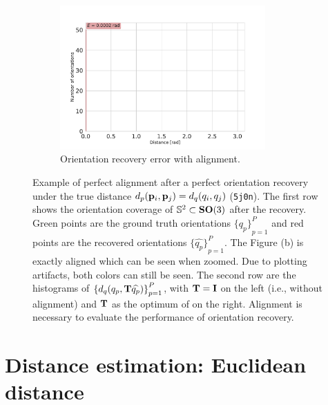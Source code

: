 \begin{figure}[ht!]
\begin{subfigure}[b]{0.45\textwidth}
    \end{subfigure}
    \hfill
    \begin{subfigure}[b]{0.5\textwidth}
    \centering
        \includegraphics[height=5.5cm]{figures/5j0n_perfect_angle_ralignment_after}
        \caption{Orientation recovery error with alignment.}
    \end{subfigure}
    \caption{%
        Example of perfect alignment after a perfect orientation recovery under the true distance $d_p(\mathbf{p}_i, \mathbf{p}_j) = d_q(q_i, q_j)$ (\texttt{5j0n}).
        The first row shows the orientation coverage of $\mathbb{S}^2 \subset \mathrm{\mathbf{SO}}(3)$ after the recovery.
        Green points are the ground truth orientations ${\{q_p\}}_{p=1}^P$ and red points are the recovered orientations ${\{\widehat{q_p}\}}_{p=1}^P$. The Figure (b) is exactly aligned which can be seen when zoomed. Due to plotting artifacts, both colors can still be seen.
        The second row are the histograms of ${\{ d_q (q_p, \mathbf{T} \widehat{q_p}) \}}_{p=1}^P$, with $\mathbf{T} = \mathbf{I}$ on the left (i.e., without alignment) and $\mathbf{T}$ as the optimum of  on the right.
        Alignment is necessary to evaluate the performance of orientation recovery.
    }\label{fig:5j0n-aa-loss-perfect-distances}
\end{figure}

\section{Distance estimation: Euclidean distance}\label{apx:results:distance-estimation}

